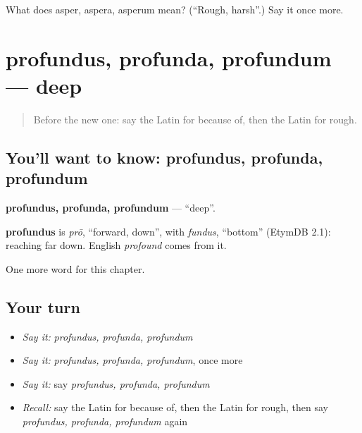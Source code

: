 \begin{tcolorbox}[breakable,colback=teal!4,colframe=teal!35!black,title={Before you move on}]
What does asper, aspera, asperum mean? (\textquotedblleft{}Rough, harsh\textquotedblright{}.) Say it once more.
\end{tcolorbox}
\section[profundus, profunda, profundum]{profundus, profunda, profundum — deep}

\label{lesson:LA-C240-profundus}



\begin{quote}
Before the new one: say the Latin for because of, then the Latin for rough.
\end{quote}

\subsection*{You'll want to know: profundus, profunda, profundum}
\textbf{profundus, profunda, profundum} — \textquotedblleft{}deep\textquotedblright{}.

\begin{cousinweb}
\textbf{profundus} is \emph{prō}, \textquotedblleft{}forward, down\textquotedblright{}, with \emph{fundus}, \textquotedblleft{}bottom\textquotedblright{} (EtymDB 2.1): reaching far down. English \emph{profound} comes from it.
\end{cousinweb}

\begin{grammarlens}[title={What you've built}]
One more word for this chapter.
\end{grammarlens}

\subsection*{Your turn}
\begin{itemize}
\raggedright
  \item \emph{Say it:} \emph{profundus, profunda, profundum}
  \item \emph{Say it:} \emph{profundus, profunda, profundum}, once more
  \item \emph{Say it:} say \emph{profundus, profunda, profundum}
  \item \emph{Recall:} say the Latin for because of, then the Latin for rough, then say \emph{profundus, profunda, profundum} again
\end{itemize}

